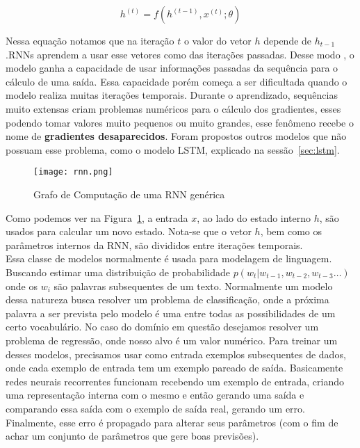 \[h^{(t)} = f(h^{(t-1)},x^{(t)};\theta)\]

Nessa equação notamos que na iteração $t$ o valor do vetor $h$ depende de
$h_{t-1}$.RNNs aprendem a usar esse vetores como
 das iterações passadas. Desse modo , o modelo ganha a capacidade
de usar informações passadas da sequência para o cálculo
de uma saída. Essa capacidade porém começa a ser dificultada quando o modelo
realiza muitas iterações temporais. Durante o aprendizado, sequências muito
extensas criam problemas numéricos para o cálculo dos gradientes, esses podendo
tomar valores muito pequenos ou muito grandes, esse fenômeno recebe o nome de
\textbf{gradientes desaparecidos}. Foram propostos outros modelos
que não possuam esse problema, como o modelo LSTM, explicado na sessão~\ref{sec:lstm}. 

\begin{figure}[H]
\centering
\texttt{[image: rnn.png]}
\caption{Grafo de Computação de uma RNN genérica \citep{dlbook}}
\label{fig:rnngraph}
\end{figure}

Como podemos ver na Figura~\ref{fig:rnngraph}, a entrada $x$, ao lado do estado
interno $h$, são usados para calcular um novo estado. Nota-se que o vetor $h$,
bem como os parâmetros internos da RNN, são divididos entre iterações temporais.
\\

Essa classe de modelos normalmente é usada para modelagem de linguagem. Buscando
estimar uma distribuição de probabilidade $p(w_t | w_{t-1},w_{t-2},w_{t-3} \dots
) $ onde os $w_i$ são palavras subsequentes de um texto. Normalmente um modelo
dessa natureza busca resolver um problema de classificação, onde a próxima palavra
a ser prevista pelo modelo é uma entre todas as possibilidades de um certo
vocabulário. No caso do domínio em questão desejamos resolver um problema de
regressão, onde nosso alvo é um valor numérico. Para treinar um desses modelos,
precisamos usar como entrada exemplos subsequentes de dados, onde cada exemplo
de entrada tem um exemplo pareado de saída. Basicamente redes neurais
recorrentes funcionam recebendo um exemplo de entrada, criando uma representação
interna com o mesmo e então gerando uma saída e comparando essa saída com o
exemplo de saída real, gerando um erro. Finalmente, esse erro é propagado para
alterar seus parâmetros (com o fim de achar um conjunto de parâmetros que gere
boas previsões). \\ 


